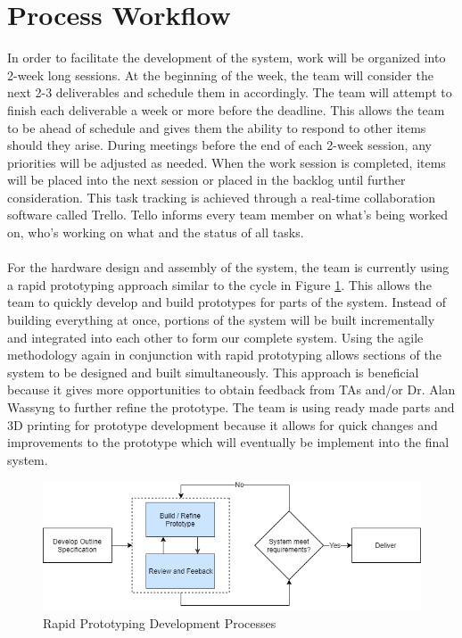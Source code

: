 \documentclass[11pt]{article}
\begin{document}
\section{Process Workflow}
In order to facilitate the development of the system, work will be organized into 2-week long sessions. At the beginning of the week, the team will consider the next 2-3 deliverables and schedule them in accordingly. The team will attempt to finish each deliverable a week or more before the deadline. This allows the team to be ahead of schedule and gives them the ability to respond to other items should they arise. During meetings before the end of each 2-week session, any priorities will be adjusted as needed. When the work session is completed, items will be placed into the next session or placed in the backlog until further consideration. This task tracking is achieved through a real-time collaboration software called Trello. Tello informs every team member on what's being worked on, who's working on what and the status of all tasks.   \\\\
For the hardware design and assembly of the system, the team is currently using a rapid prototyping approach similar to the cycle in Figure \ref{fig:rapid}. This allows the team to quickly develop and build prototypes for parts of the system. Instead of building everything at once, portions of the system will be built incrementally and integrated into each other to form our complete system. Using the agile methodology again in conjunction with rapid prototyping allows sections of the system to be designed and built simultaneously. This approach is beneficial because it gives more opportunities to obtain feedback from TAs and/or Dr. Alan Wassyng to further refine the prototype. The team is using ready made parts and 3D printing for prototype development because it allows for quick changes and improvements to the prototype which will eventually be implement into the final system.
\begin{figure}
	\centering
	\includegraphics[width=.8\textwidth]{img/Rapid-Prototyping-Dev-Process.png}
	\caption[]{Rapid Prototyping Development Processes}
	\label{fig:rapid}
\end{figure}
\end{document}
